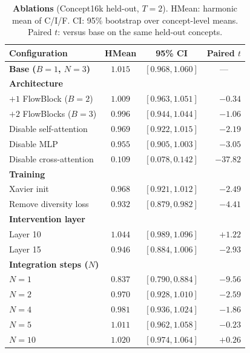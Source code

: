 \documentclass{article}
\newcommand{\st}[1]{\rlap{$^{#1}$}}
\begin{document}
\begin{table}
    \centering
    \vspace{-3mm}
    \footnotesize
    \setlength{\tabcolsep}{4pt} 
    \begin{tabular}{l c c r}
        \toprule
        \textbf{Configuration} & \textbf{HMean} & \textbf{95\% CI} & \multicolumn{1}{c}{\textbf{Paired $t$}} \\
        \midrule
        \textbf{Base ($B\!=\!1$, $N\!=\!3$)} & $1.015$ & $[0.968, 1.060]$ & \multicolumn{1}{c}{---} \\
        \midrule
        \multicolumn{4}{l}{\textbf{Architecture}} \\
        $+1$ FlowBlock ($B\!=\!2$)  & $1.009$       & $[0.963, 1.051]$ & $-0.34$ \\
        $+2$ FlowBlocks ($B\!=\!3$) & $0.996$       & $[0.944, 1.044]$ & $-1.06$ \\
        Disable self-attention      & $0.969$\st{*} & $[0.922, 1.015]$ & $-2.19$ \\
        Disable MLP                 & $0.955$\st{**}& $[0.905, 1.003]$ & $-3.05$ \\
        Disable cross-attention     & $0.109$\st{***}& $[0.078, 0.142]$ & $-37.82$ \\
        \midrule
        \multicolumn{4}{l}{\textbf{Training}} \\
        Xavier init                 & $0.968$\st{*} & $[0.921, 1.012]$ & $-2.49$ \\
        Remove diversity loss       & $0.932$\st{***}& $[0.879, 0.982]$ & $-4.41$ \\
        \midrule
        \multicolumn{4}{l}{\textbf{Intervention layer}} \\
        Layer 10                    & $1.044$       & $[0.989, 1.096]$ & $+1.22$ \\
        Layer 15                    & $0.946$\st{**}& $[0.884, 1.006]$ & $-2.93$ \\
        \midrule
        \multicolumn{4}{l}{\textbf{Integration steps ($N$)}} \\
        $N = 1$                     & $0.837$\st{***}& $[0.790, 0.884]$ & $-9.56$ \\
        $N = 2$                     & $0.970$\st{**}& $[0.928, 1.010]$ & $-2.59$ \\
        $N = 4$                     & $0.981$       & $[0.936, 1.024]$ & $-1.86$ \\
        $N = 5$                     & $1.011$       & $[0.962, 1.058]$ & $-0.23$ \\
        $N = 10$                    & $1.020$       & $[0.974, 1.064]$ & $+0.26$ \\
        \bottomrule
    \end{tabular}
    \caption{\textbf{Ablations} (Concept16k held-out, $T\!=\!2$). HMean: harmonic mean of C/I/F. CI: 95\% bootstrap over concept-level means. Paired $t$: versus base on the same held-out concepts.}
    \label{tab:ablation}
    \vspace{-4mm}
\end{table}
\end{document}
